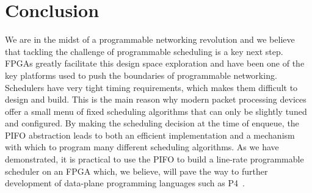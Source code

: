 \section{Conclusion}

We are in the midst of a programmable networking revolution and we believe that tackling the challenge of programmable scheduling is a key next step. FPGAs greatly facilitate this design space exploration and have been one of the key platforms used to push the boundaries of programmable networking. Schedulers have very tight timing requirements, which makes them difficult to design and build. This is the main reason why modern packet processing devices offer a small menu of fixed scheduling algorithms that can only be slightly tuned and configured. By making the scheduling decision at the time of enqueue, the PIFO abstraction leads to both an efficient implementation and a mechanism with which to program many different scheduling algorithms. As we have demonstrated, it is practical to use the PIFO to build a line-rate programmable scheduler on an FPGA which, we believe, will pave the way to further development of data-plane programming languages such as P4~\cite{p4:2014}.




